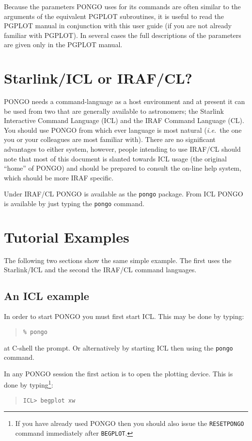 \documentclass[twoside,11pt]{article}
\newcommand{\htmlref}[2]{#1}
\renewcommand{\_}{\texttt{\symbol{95}}}
\newcommand{\ie}{{\em i.e.\ }}
\newcommand{\cnam}[1]{{\tt #1}}
\newcommand{\iref} [1]{\htmlref{#1}{#1}}
\begin{document}
Because the parameters PONGO uses for its commands are often similar
to the arguments of the equivalent PGPLOT subroutines, it is useful to
read the PGPLOT manual in conjunction with this user guide (if you are
not already familiar with PGPLOT).
In several cases the full descriptions of the parameters are given
only in the PGPLOT manual.

\section{Starlink/ICL or IRAF/CL?}
PONGO needs a command-language as a host environment and at present it
can be used from two that are generally available to astronomers; the
Starlink Interactive Command Language (ICL) and the IRAF Command
Language (CL).  You should use PONGO from which ever language is most
natural (\ie the one you or your colleagues are most familiar
with). There are no significant advantages to either system, however,
people intending to use IRAF/CL should note that most of this document
is slanted towards ICL usage (the original ``home'' of PONGO) and
should be prepared to consult the on-line help system, which should be
more IRAF specific.

Under IRAF/CL PONGO is available as the \verb+pongo+ package. From ICL
PONGO is available by just typing the \verb+pongo+ command.

\section{Tutorial Examples}
The following two sections show the same simple example. The first
uses the Starlink/ICL and the second the IRAF/CL command
languages.

\subsection{An ICL example}

In order to start PONGO you must first start ICL. This may be done by typing:
\begin{quote}
\begin{verbatim}
% pongo
\end{verbatim}
\end{quote}
at C-shell the prompt. Or alternatively by starting ICL then using the
\verb+pongo+ command.

In any PONGO session the first action is to open the plotting device.
This is done by typing\footnote{ If you have already used PONGO then
you should also issue the \cnam{\iref{RESETPONGO}} command immediately
after \cnam{\iref{BEGPLOT}}.}:
\begin{quote}
\begin{verbatim}
ICL> begplot xw
\end{verbatim}
\end{quote}
\end{document}
